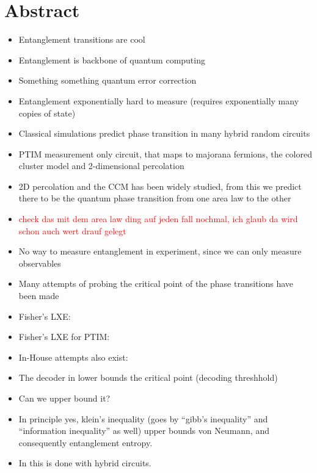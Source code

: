 \chapter{Abstract}
\label{ch:intro}

\begin{itemize}
  \item Entanglement transitions are cool
  \item Entanglement is backbone of quantum computing
  \item Something something quantum error correction
  \item Entanglement exponentially hard to measure (requires exponentially many
    copies of state)
  \item Classical simulations predict phase transition in many hybrid random
    circuits
  \item PTIM \cite{langEntanglementTransitionProjective2020} measurement only
    circuit, that maps to majorana fermions, the colored cluster model and
    2-dimensional percolation
  \item 2D percolation and the CCM has been widely studied, from this we
    predict there to be the quantum phase transition from one area law to the
    other
  \item \textcolor{red}{check das mit dem area law ding auf jeden fall nochmal,
    ich glaub da wird schon auch wert drauf gelegt}
  \item No way to measure entanglement in experiment, since we can only measure
    observables
  \item Many attempts of probing the critical point of the phase transitions
    have been made
  \item Fisher's LXE: \cite{liCrossEntropyBenchmark2023}
  \item Fisher's LXE for PTIM:
    \cite{tikhanovskayaUniversalityCrossEntropy2023}
  \item In-House attempts also exist:
  \item The decoder in \cite{roserDecodingProjectiveTransverse2023} lower
    bounds the critical point (decoding threshhold)
  \item Can we upper bound it?
  \item In principle yes, klein's inequality (goes by \enquote{gibb's
    inequality} and \enquote{information inequality} as well) upper bounds
    von Neumann, and consequently entanglement entropy.
  \item In \cite{garrattProbingPostmeasurementEntanglement2023} this is done
    with hybrid circuits.
\end{itemize}


\lipsum[0-1]

